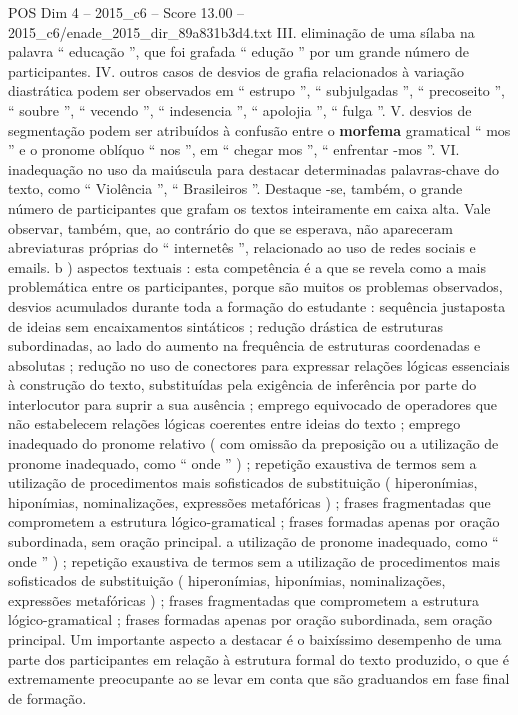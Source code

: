 \begin{textsample}{POS Dim 4 – 2015\_c6 – Score 13.00 – 2015\_c6/enade\_2015\_dir\_89a831b3d4.txt}
III. eliminação de uma sílaba na palavra “ educação ”, que foi grafada “ edução ” por um grande número de participantes.
IV. outros casos de desvios de grafia relacionados à variação diastrática podem ser observados em “ estrupo ”, “ subjulgadas ”, “ precoseito ”, “ soubre ”, “ vecendo ”, “ indesencia ”, “ apolojia ”, “ fulga ”.
V. desvios de segmentação podem ser atribuídos à confusão entre o \textbf{morfema} gramatical “ mos ” e o pronome oblíquo “ nos ”, em “ chegar mos ”, “ enfrentar -mos ”.
VI. inadequação no uso da maiúscula para destacar determinadas palavras-chave do texto, como “ Violência ”, “ Brasileiros ”.
Destaque -se, também, o grande número de participantes que grafam os textos inteiramente em caixa alta.
Vale observar, também, que, ao contrário do que se esperava, não apareceram abreviaturas próprias do “ internetês ”, relacionado ao uso de redes sociais e emails. b ) aspectos textuais : esta competência é a que se revela como a mais problemática entre os participantes, porque são muitos os problemas observados, desvios acumulados durante toda a formação do estudante : sequência justaposta de ideias sem encaixamentos sintáticos ; redução drástica de estruturas subordinadas, ao lado do aumento na frequência de estruturas coordenadas e absolutas ; redução no uso de conectores para expressar relações lógicas essenciais à construção do texto, substituídas pela exigência de inferência por parte do interlocutor para suprir a sua ausência ; emprego equivocado de operadores que não estabelecem relações lógicas coerentes entre ideias do texto ; emprego inadequado do pronome relativo ( com omissão da preposição ou a utilização de pronome inadequado, como “ onde ” ) ; repetição exaustiva de termos sem a utilização de procedimentos mais sofisticados de substituição ( hiperonímias, hiponímias, nominalizações, expressões metafóricas ) ; frases fragmentadas que comprometem a estrutura lógico-gramatical ; frases formadas apenas por oração subordinada, sem oração principal. a utilização de pronome inadequado, como “ onde ” ) ; repetição exaustiva de termos sem a utilização de procedimentos mais sofisticados de substituição ( hiperonímias, hiponímias, nominalizações, expressões metafóricas ) ; frases fragmentadas que comprometem a estrutura lógico-gramatical ; frases formadas apenas por oração subordinada, sem oração principal.
Um importante aspecto a destacar é o baixíssimo desempenho de uma parte dos participantes em relação à estrutura formal do texto produzido, o que é extremamente preocupante ao se levar em conta que são graduandos em fase final de formação.

\end{textsample}
